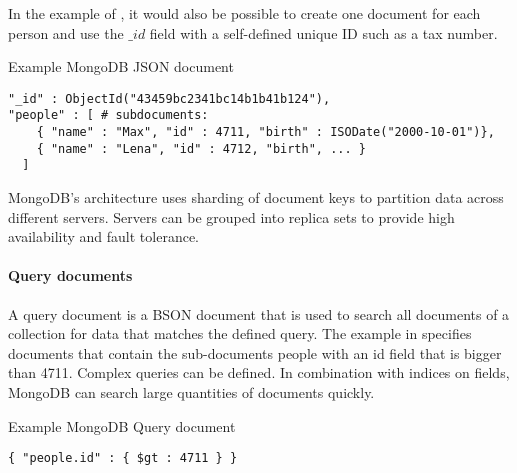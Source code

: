 In the example of , it would also be possible to create one document for each person and use the $\_id$ field with a self-defined unique ID such as a tax number.

\begin{tcbcode}[label={lst:mongoJSON}]{Example MongoDB JSON document}
\begin{lstlisting}
"_id" : ObjectId("43459bc2341bc14b1b41b124"),
"people" : [ # subdocuments:
    { "name" : "Max", "id" : 4711, "birth" : ISODate("2000-10-01")},
    { "name" : "Lena", "id" : 4712, "birth", ... }
  ]
\end{lstlisting}
\end{tcbcode}


MongoDB's architecture uses sharding of document keys to partition data across different servers.
Servers can be grouped into replica sets to provide high availability and fault tolerance.

\paragraph{Query documents}

A query document is a BSON document that is used to search all documents of a collection for data that matches the defined query.
The example in  specifies documents that contain the sub-documents people with an id field that is bigger than 4711.
Complex queries can be defined.
In combination with indices on fields, MongoDB can search large quantities of documents quickly.

\begin{tcbcode}[label={lst:mongoQuery}]{Example MongoDB Query document}
\begin{lstlisting}
{ "people.id" : { $gt : 4711 } }
\end{lstlisting}
\end{tcbcode}
